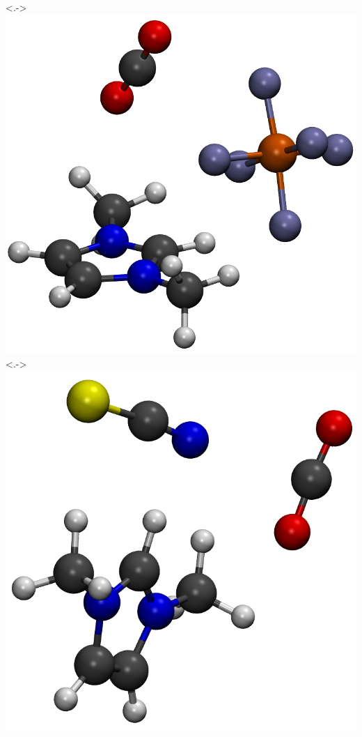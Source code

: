 \documentclass[xcolor=usenames,dvipsnames,svgnames]{beamer}
\begin{document}
\begin{frame}
\begin{columns}
    \uncover<.->{\includegraphics[scale=0.08]{./figures/cluster_PF6.png}}
    \uncover<.->{\includegraphics[scale=0.08]{./figures/cluster_SCN.png}}

\end{columns}
\end{frame}
\end{document}

